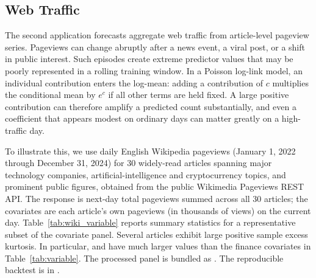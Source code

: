 \documentclass[article,shortnames,nofooter]{jss}
\begin{document}
\begin{table}[h]
    \centering
    
    \caption{Elapsed time for the complete finance backtest: median and range in seconds across three serial repetitions. The  and  runs both use an active contribution penalty ($\gamma=0.1$), while  uses only coefficient regularization.}
    \label{tab:runtime}
\end{table}

\subsection{Web Traffic}\label{sec:examples-web}

The second application forecasts aggregate web traffic from article-level pageview series. Pageviews can change abruptly after a news event, a viral post, or a shift in public interest. Such episodes create extreme predictor values that may be poorly represented in a rolling training window. In a Poisson log-link model, an individual contribution enters the log-mean: adding a contribution of $c$ multiplies the conditional mean by $e^c$ if all other terms are held fixed. A large positive contribution can therefore amplify a predicted count substantially, and even a coefficient that appears modest on ordinary days can matter greatly on a high-traffic day.

To illustrate this, we use daily English Wikipedia pageviews (January 1, 2022 through December 31, 2024) for 30 widely-read articles spanning major technology companies, artificial-intelligence and cryptocurrency topics, and prominent public figures, obtained from the public Wikimedia Pageviews REST API. The response is next-day total pageviews summed across all 30 articles; the covariates are each article's own pageviews (in thousands of views) on the current day. Table~\ref{tab:wiki_variable} reports summary statistics for a representative subset of the covariate panel. Several articles exhibit large positive sample excess kurtosis. In particular,  and  have much larger values than the finance covariates in Table~\ref{tab:variable}. The processed panel is bundled as . The reproducible backtest is in .

\begin{table}[ht]
\centering

\caption{Summary statistics (daily pageviews, in thousands) for selected articles in the web-traffic dataset. Several articles exhibit pronounced positive excess kurtosis, reflecting occasional viral spikes far outside their typical range.}
\label{tab:wiki_variable}
\end{table}
\end{document}
